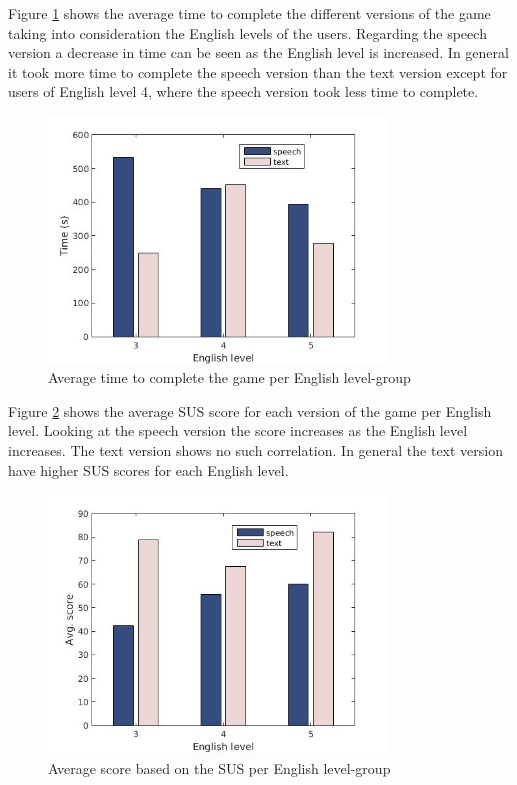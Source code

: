 Figure \ref{eng_time} shows the average time to complete the different versions of the game taking into consideration the English levels of the users. Regarding the speech version a decrease in time can be seen as the English level is increased. In general it took more time to complete the speech version than the text version except for users of English level 4, where the speech version took less time to complete.

\begin{figure}[H]
  \centering
  \includegraphics[width=0.8\textwidth]{images/english_time.jpg}
  \caption{Average time to complete the game per English level-group}\label{eng_time}
\end{figure}

Figure \ref{eng_score} shows the average SUS score for each version of the game per English level. Looking at the speech version the score increases as the English level increases. The text version shows no such correlation. In general the text version have higher SUS scores for each English level.

\begin{figure}[H]
  \centering
  \includegraphics[width=0.8\textwidth]{images/english_score.jpg}
  \caption{Average score based on the SUS per English level-group}\label{eng_score}
\end{figure}

